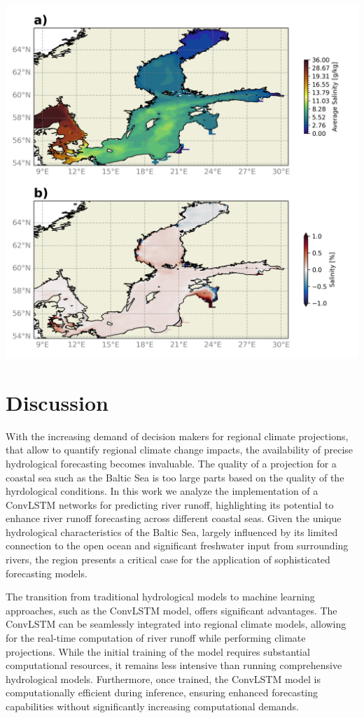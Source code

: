 \documentclass[
]{agujournal2019}
\begin{document}
\includegraphics{../src/figures/evaluation_MOM.png}

\hypertarget{discussion}{%
\section{Discussion}\label{discussion}}

With the increasing demand of decision makers for regional climate
projections, that allow to quantify regional climate change impacts, the
availability of precise hydrological forecasting becomes invaluable. The
quality of a projection for a coastal sea such as the Baltic Sea is too
large parts based on the quality of the hyrdological conditions. In this
work we analyze the implementation of a ConvLSTM networks for predicting
river runoff, highlighting its potential to enhance river runoff
forecasting across different coastal seas. Given the unique hydrological
characteristics of the Baltic Sea, largely influenced by its limited
connection to the open ocean and significant freshwater input from
surrounding rivers, the region presents a critical case for the
application of sophisticated forecasting models.

The transition from traditional hydrological models to machine learning
approaches, such as the ConvLSTM model, offers significant advantages.
The ConvLSTM can be seamlessly integrated into regional climate models,
allowing for the real-time computation of river runoff while performing
climate projections. While the initial training of the model requires
substantial computational resources, it remains less intensive than
running comprehensive hydrological models. Furthermore, once trained,
the ConvLSTM model is computationally efficient during inference,
ensuring enhanced forecasting capabilities without significantly
increasing computational demands.
\end{document}

